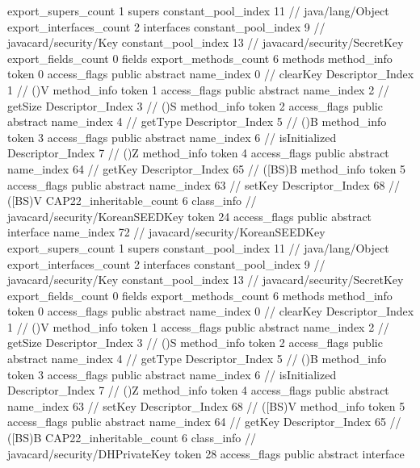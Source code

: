{{{			export_supers_count	1
			supers {
				constant_pool_index	11		// java/lang/Object
			}
			export_interfaces_count	2
			interfaces {
				constant_pool_index	9		// javacard/security/Key
				constant_pool_index	13		// javacard/security/SecretKey
			}
			export_fields_count	0
			fields {
			}
			export_methods_count	6
			methods {
				method_info {
					token	0
					access_flags	public abstract
					name_index	0		// clearKey
					Descriptor_Index	1		// ()V
				}
				method_info {
					token	1
					access_flags	public abstract
					name_index	2		// getSize
					Descriptor_Index	3		// ()S
				}
				method_info {
					token	2
					access_flags	public abstract
					name_index	4		// getType
					Descriptor_Index	5		// ()B
				}
				method_info {
					token	3
					access_flags	public abstract
					name_index	6		// isInitialized
					Descriptor_Index	7		// ()Z
				}
				method_info {
					token	4
					access_flags	public abstract
					name_index	64		// getKey
					Descriptor_Index	65		// ([BS)B
				}
				method_info {
					token	5
					access_flags	public abstract
					name_index	63		// setKey
					Descriptor_Index	68		// ([BS)V
				}
			}
			CAP22_inheritable_count	6
		}
		class_info {		// javacard/security/KoreanSEEDKey
			token	24
			access_flags	public abstract interface
			name_index	72		// javacard/security/KoreanSEEDKey
			export_supers_count	1
			supers {
				constant_pool_index	11		// java/lang/Object
			}
			export_interfaces_count	2
			interfaces {
				constant_pool_index	9		// javacard/security/Key
				constant_pool_index	13		// javacard/security/SecretKey
			}
			export_fields_count	0
			fields {
			}
			export_methods_count	6
			methods {
				method_info {
					token	0
					access_flags	public abstract
					name_index	0		// clearKey
					Descriptor_Index	1		// ()V
				}
				method_info {
					token	1
					access_flags	public abstract
					name_index	2		// getSize
					Descriptor_Index	3		// ()S
				}
				method_info {
					token	2
					access_flags	public abstract
					name_index	4		// getType
					Descriptor_Index	5		// ()B
				}
				method_info {
					token	3
					access_flags	public abstract
					name_index	6		// isInitialized
					Descriptor_Index	7		// ()Z
				}
				method_info {
					token	4
					access_flags	public abstract
					name_index	63		// setKey
					Descriptor_Index	68		// ([BS)V
				}
				method_info {
					token	5
					access_flags	public abstract
					name_index	64		// getKey
					Descriptor_Index	65		// ([BS)B
				}
			}
			CAP22_inheritable_count	6
		}
		class_info {		// javacard/security/DHPrivateKey
			token	28
			access_flags	public abstract interface
}}}
